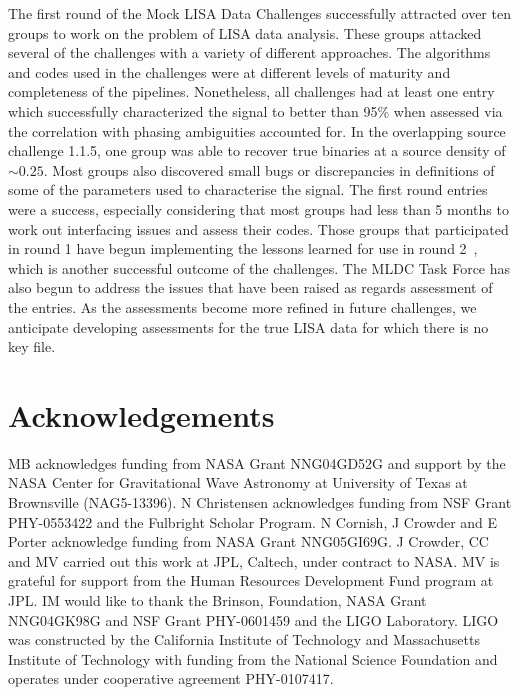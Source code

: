 \documentclass[12pt]{iopart}
\begin{document}
The first round of the Mock LISA Data Challenges successfully attracted over ten groups to work on the problem of LISA data analysis. These groups attacked several of the challenges with a variety of different approaches. The algorithms and codes used in the challenges were at different levels of maturity and completeness of the pipelines. Nonetheless, all challenges had at least one entry which successfully characterized the signal to better than 95\% when assessed via the correlation with phasing ambiguities accounted for. In the overlapping source challenge 1.1.5, one group was able to recover true binaries at a source density of $\sim 0.25$. Most groups also discovered small bugs or discrepancies in definitions of some of the parameters used to characterise the signal. The first round entries were a success, especially considering that most groups had less than 5 months to work out interfacing issues and assess their codes. Those groups that participated in round 1 have begun implementing the lessons learned for use in round 2~\cite{MLDC2doc}, which is another successful outcome of the challenges. The MLDC Task Force has also begun to address the issues that have been raised as regards assessment of the entries. As the assessments become more refined in future challenges, we anticipate developing assessments for the true LISA data for which there is no key file.

\section*{Acknowledgements}
MB acknowledges funding from NASA Grant NNG04GD52G and support by the NASA Center for Gravitational Wave Astronomy at University of Texas at Brownsville (NAG5-13396). N Christensen acknowledges funding from NSF Grant PHY-0553422 and the Fulbright Scholar Program. N Cornish, J Crowder and E Porter acknowledge funding from NASA Grant NNG05GI69G. J Crowder, CC and MV carried out this work at JPL, Caltech, under contract to NASA. MV is grateful for support from the Human Resources Development Fund program at JPL. IM would like to thank the Brinson, Foundation, NASA Grant NNG04GK98G and NSF Grant PHY-0601459 and the LIGO Laboratory. LIGO was constructed by the California Institute of Technology and Massachusetts Institute of Technology with funding from the National Science Foundation and operates under cooperative agreement PHY-0107417.
\end{document}
